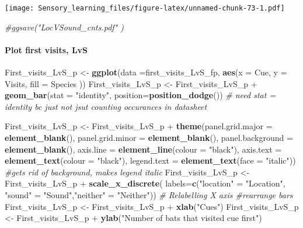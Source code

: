 \documentclass[]{article}
\newenvironment{Shaded}{\begin{snugshade}}{\end{snugshade}}
\newcommand{\KeywordTok}[1]{\textcolor[rgb]{0.13,0.29,0.53}{\textbf{{#1}}}}
\newcommand{\DataTypeTok}[1]{\textcolor[rgb]{0.13,0.29,0.53}{{#1}}}
\newcommand{\StringTok}[1]{\textcolor[rgb]{0.31,0.60,0.02}{{#1}}}
\newcommand{\CommentTok}[1]{\textcolor[rgb]{0.56,0.35,0.01}{\textit{{#1}}}}
\newcommand{\NormalTok}[1]{{#1}}
\let\oldparagraph\paragraph
\renewcommand{\paragraph}[1]{\oldparagraph{#1}\mbox{}}
\begin{document}
\texttt{[image: Sensory\_learning\_files/figure-latex/unnamed-chunk-73-1.pdf]}

\begin{Shaded}
\begin{Highlighting}[]
\CommentTok{#ggsave("LocVSound_cnts.pdf"  )}
\end{Highlighting}
\end{Shaded}

\paragraph{Plot first visits, LvS}\label{plot-first-visits-lvs}

\begin{Shaded}
\begin{Highlighting}[]
\NormalTok{First_visits_LvS_p <-}\StringTok{ }\KeywordTok{ggplot}\NormalTok{(}\DataTypeTok{data =}\NormalTok{first_visits_LvS_fp, }\KeywordTok{aes}\NormalTok{(}\DataTypeTok{x =} \NormalTok{Cue, }\DataTypeTok{y =} \NormalTok{Visits, }\DataTypeTok{fill =} \NormalTok{Species ))}
\NormalTok{First_visits_LvS_p <-}\StringTok{ }\NormalTok{First_visits_LvS_p +}\StringTok{ }\KeywordTok{geom_bar}\NormalTok{(}\DataTypeTok{stat =} \StringTok{"identity"}\NormalTok{, }\DataTypeTok{position=}\KeywordTok{position_dodge}\NormalTok{()) }\CommentTok{# need stat = identity bc just not jsut counting occurances in datasheet}

\NormalTok{First_visits_LvS_p  <-}\StringTok{ }\NormalTok{First_visits_LvS_p  +}\StringTok{ }\KeywordTok{theme}\NormalTok{(}\DataTypeTok{panel.grid.major =} \KeywordTok{element_blank}\NormalTok{(), }\DataTypeTok{panel.grid.minor =} \KeywordTok{element_blank}\NormalTok{(),}
\DataTypeTok{panel.background =} \KeywordTok{element_blank}\NormalTok{(), }\DataTypeTok{axis.line =} \KeywordTok{element_line}\NormalTok{(}\DataTypeTok{colour =} \StringTok{"black"}\NormalTok{), }\DataTypeTok{axis.text =} \KeywordTok{element_text}\NormalTok{(}\DataTypeTok{colour =} \StringTok{"black"}\NormalTok{), }\DataTypeTok{legend.text =} \KeywordTok{element_text}\NormalTok{(}\DataTypeTok{face =} \StringTok{"italic"}\NormalTok{))  }\CommentTok{#gets rid of background, makes legend italic}
\NormalTok{First_visits_LvS_p  <-}\StringTok{ }\NormalTok{First_visits_LvS_p  +}\StringTok{ }\KeywordTok{scale_x_discrete}\NormalTok{( }\DataTypeTok{labels=}\KeywordTok{c}\NormalTok{(}\StringTok{"location"} \NormalTok{=}\StringTok{ "Location"}\NormalTok{, }\StringTok{"sound"} \NormalTok{=}\StringTok{ "Sound"}\NormalTok{,}\StringTok{"neither"} \NormalTok{=}\StringTok{ "Neither"}\NormalTok{))  }\CommentTok{# Relabelling X axis #rearrange bars}
\NormalTok{First_visits_LvS_p  <-}\StringTok{ }\NormalTok{First_visits_LvS_p  +}\StringTok{ }\KeywordTok{xlab}\NormalTok{(}\StringTok{"Cues"}\NormalTok{)}
\NormalTok{First_visits_LvS_p  <-}\StringTok{ }\NormalTok{First_visits_LvS_p  +}\StringTok{ }\KeywordTok{ylab}\NormalTok{(}\StringTok{"Number of bats that visited cue first"}\NormalTok{)}


\end{Highlighting}
\end{Shaded}
\end{document}
